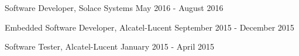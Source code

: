 \begin{cventries}
  \cventryOneLine
    {Software Developer,} %
    {Solace Systems} %
    {May 2016 - August 2016} %

  \cventryOneLine
    {Embedded Software Developer,} %
    {Alcatel-Lucent} %
    {September 2015 - December 2015} %

  \cventryOneLine
    {Software Tester,} %
    {Alcatel-Lucent} %
    {January 2015 - April 2015} %

\end{cventries}

